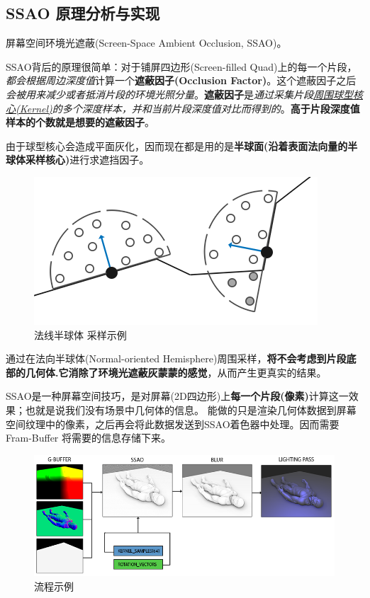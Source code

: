 \documentclass[UTF8,a4paper,12pt]{ctexbook}
\begin{document}
		\subsection{SSAO 原理分析与实现}
			屏幕空间环境光遮蔽(Screen-Space Ambient Occlusion, SSAO)。
			
			SSAO背后的原理很简单：对于铺屏四边形(Screen-filled Quad)上的每一个片段，\textit{都会根据周边深度值}计算一个\textbf{遮蔽因子(Occlusion Factor)}。这个遮蔽因子之后\textit{会被用来减少或者抵消片段的环境光照分量}。\textbf{遮蔽因子}是\textit{通过采集片段\underline{周围球型核心(Kernel)}的多个深度样本，并和当前片段深度值对比而得到的}。\textbf{高于片段深度值样本的个数就是想要的遮蔽因子}。
			
			由于球型核心会造成平面灰化，因而现在都是用的是\textbf{半球面(沿着表面法向量的半球体采样核心)}进行求遮挡因子。
			\begin{figure}[H]
				\centering
				\includegraphics[width=.78\linewidth]{ssao_hemisphere}
				\caption{法线半球体 采样示例}
			\end{figure}
			
			通过在法向半球体(Normal-oriented Hemisphere)周围采样，\textbf{将不会考虑到片段底部的几何体.它消除了环境光遮蔽灰蒙蒙的感觉}，从而产生更真实的结果。
			
			SSAO是一种屏幕空间技巧，是对屏幕(2D四边形)上\textbf{每一个片段(像素)}计算这一效果；也就是说我们没有场景中几何体的信息。
			能做的只是渲染几何体数据到屏幕空间纹理中的像素，之后再会将此数据发送到SSAO着色器中处理。因而需要Fram-Buffer 将需要的信息存储下来。
			
			\begin{figure}[H]
				\centering
				\includegraphics[width=\linewidth]{SSAO}
				\caption{流程示例}
			\end{figure}
			
\end{document}
